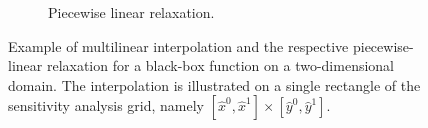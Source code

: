 \documentclass[pdflatex,sn-mathphys-num]{sn-jnl}%
\begin{document}
\begin{figure}[h]
\begin{subfigure}[t]{0.49\textwidth}
    \caption{Piecewise linear relaxation.}\label{fig:pwl-relaxation}
    \end{subfigure}
    \caption{Example of multilinear interpolation and the respective piecewise-linear relaxation for a black-box function on a two-dimensional domain. The interpolation is illustrated on a single rectangle of the sensitivity analysis grid, namely $[\hat{x}^0,\hat{x}^1] \times [\hat{y}^0,\hat{y}^1]$.}
    \label{fig:bilinear-interp-example}
\end{figure}
\end{document}
